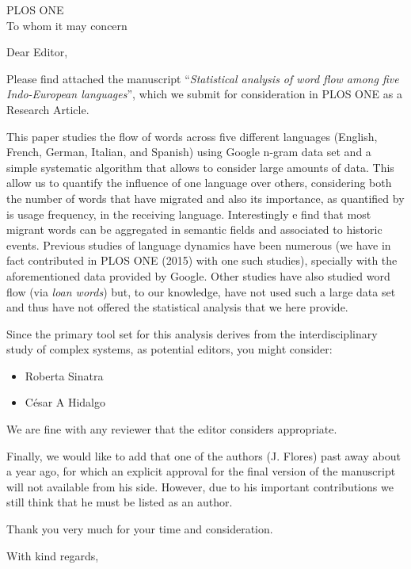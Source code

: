 \documentclass[11pt, addrfooterall ]{if_letter_2013}
\begin{document}
\begin{letter}{
PLOS ONE\\
To whom it may concern
}
\opening{Dear Editor,}

Please find attached the manuscript ``{\it Statistical analysis of word flow
among five Indo-European languages}'', which we submit for consideration in
PLOS ONE as a Research Article. 

This paper studies the flow of words across five different languages (English, French, German, Italian, and Spanish) using Google n-gram data set and a simple systematic algorithm that allows to consider large amounts of data.  This allow us to quantify the influence of one language over others, considering both the number of words that have migrated and also its importance, as quantified by is usage frequency, in the receiving language.  Interestingly e find that most migrant words can be aggregated in semantic fields and associated to historic events.  Previous studies of language dynamics have been numerous (we have in fact contributed in PLOS ONE (2015) with one such studies), specially with the aforementioned data provided by Google. Other studies have also studied word flow (via {\it loan words}) but, to our knowledge, have not used such a large data set and thus have not offered the statistical analysis that we here provide. 


Since the primary tool set for this analysis derives from the interdisciplinary
study of complex systems, as potential editors, you might consider:
\begin{itemize}
\item Roberta Sinatra
\item César A Hidalgo
\end{itemize}
We are fine with any reviewer that the editor considers appropriate.


Finally, we would like to add that one of the authors (J. Flores) past away
about a year ago, for which an explicit approval for the final version of the
manuscript will
not available from his side. However, due to his important contributions we still think that
he must be listed as an author. 

Thank you very much for your time and consideration.



% 

\closing{With kind regards,}

\end{letter}
\end{document}
